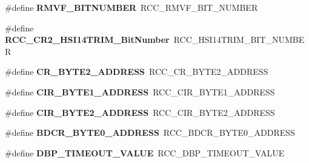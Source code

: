 \begin{DoxyCompactItemize}
\item 
\mbox{\label{group___h_a_l___r_c_c___aliased_gad4cc72917b15affc54b4d28e6529634c}} 
\#define {\bfseries R\+M\+V\+F\+\_\+\+B\+I\+T\+N\+U\+M\+B\+ER}~R\+C\+C\+\_\+\+R\+M\+V\+F\+\_\+\+B\+I\+T\+\_\+\+N\+U\+M\+B\+ER
\item 
\mbox{\label{group___h_a_l___r_c_c___aliased_ga407a7f1f6db8025f2e21fbde11d65176}} 
\#define {\bfseries R\+C\+C\+\_\+\+C\+R2\+\_\+\+H\+S\+I14\+T\+R\+I\+M\+\_\+\+Bit\+Number}~R\+C\+C\+\_\+\+H\+S\+I14\+T\+R\+I\+M\+\_\+\+B\+I\+T\+\_\+\+N\+U\+M\+B\+ER
\item 
\mbox{\label{group___h_a_l___r_c_c___aliased_ga0193aa09fc91ebd9a119c8d98e6184a9}} 
\#define {\bfseries C\+R\+\_\+\+B\+Y\+T\+E2\+\_\+\+A\+D\+D\+R\+E\+SS}~R\+C\+C\+\_\+\+C\+R\+\_\+\+B\+Y\+T\+E2\+\_\+\+A\+D\+D\+R\+E\+SS
\item 
\mbox{\label{group___h_a_l___r_c_c___aliased_ga159aa247b8dc96a030bcb9b43ece4256}} 
\#define {\bfseries C\+I\+R\+\_\+\+B\+Y\+T\+E1\+\_\+\+A\+D\+D\+R\+E\+SS}~R\+C\+C\+\_\+\+C\+I\+R\+\_\+\+B\+Y\+T\+E1\+\_\+\+A\+D\+D\+R\+E\+SS
\item 
\mbox{\label{group___h_a_l___r_c_c___aliased_gaab58c3f3f81bf1ab9a14cf3fececd8c4}} 
\#define {\bfseries C\+I\+R\+\_\+\+B\+Y\+T\+E2\+\_\+\+A\+D\+D\+R\+E\+SS}~R\+C\+C\+\_\+\+C\+I\+R\+\_\+\+B\+Y\+T\+E2\+\_\+\+A\+D\+D\+R\+E\+SS
\item 
\mbox{\label{group___h_a_l___r_c_c___aliased_ga991be15dda03061a29712e8206a32510}} 
\#define {\bfseries B\+D\+C\+R\+\_\+\+B\+Y\+T\+E0\+\_\+\+A\+D\+D\+R\+E\+SS}~R\+C\+C\+\_\+\+B\+D\+C\+R\+\_\+\+B\+Y\+T\+E0\+\_\+\+A\+D\+D\+R\+E\+SS
\item 
\mbox{\label{group___h_a_l___r_c_c___aliased_ga3508fa29d62b42d7d9117c419e076efc}} 
\#define {\bfseries D\+B\+P\+\_\+\+T\+I\+M\+E\+O\+U\+T\+\_\+\+V\+A\+L\+UE}~R\+C\+C\+\_\+\+D\+B\+P\+\_\+\+T\+I\+M\+E\+O\+U\+T\+\_\+\+V\+A\+L\+UE
\item 
\mbox{\label{group___h_a_l___r_c_c___aliased_ga0965572baea57cdfd3616bef14d41053}} 

\end{DoxyCompactItemize}

